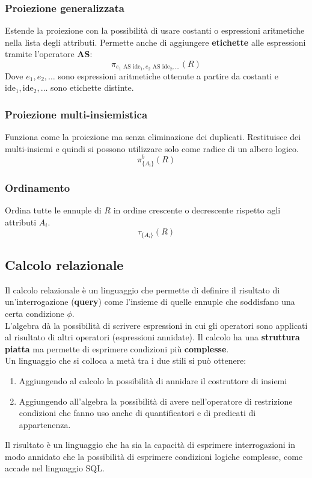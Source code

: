 \subsubsection{Proiezione generalizzata}
Estende la proiezione con la possibilità di usare costanti o espressioni aritmetiche nella lista degli attributi. Permette anche di aggiungere \textbf{etichette} alle espressioni tramite l'operatore \textbf{AS}:
\begin{equation}
	\pi_{e_1\text{ AS } \text{ide}_1, e_2\text{ AS } \text{ide}_2, \ldots}(R)
\end{equation}
Dove $e_1, e_2, \ldots$ sono espressioni aritmetiche ottenute a partire da costanti e $\text{ide}_1, \text{ide}_2, \ldots$ sono etichette distinte.
\subsubsection{Proiezione multi-insiemistica}
Funziona come la proiezione ma senza eliminazione dei duplicati. Restituisce dei multi-insiemi e quindi si possono utilizzare solo come radice di un albero logico.
\begin{equation}
	\pi^b_{\{A_i\}}(R)
\end{equation}
\subsubsection{Ordinamento}
Ordina tutte le ennuple di $R$ in ordine crescente o decrescente rispetto agli attributi $A_i$.
\begin{equation}
	\tau_{\{A_i\}}(R)
\end{equation}

\subsection{Calcolo relazionale}
Il calcolo relazionale è un linguaggio che permette di definire il risultato di un’interrogazione (\textbf{query}) come l’insieme di quelle ennuple che soddisfano una certa condizione $\phi$.\\

L’algebra dà la possibilità di scrivere espressioni in cui gli operatori sono applicati al risultato di altri operatori (espressioni annidate). Il calcolo ha una \textbf{struttura piatta} ma permette di esprimere condizioni più \textbf{complesse}.\\
Un linguaggio che si colloca a metà tra i due stili si può ottenere:
\begin{enumerate}
	\item Aggiungendo al calcolo la possibilità di annidare il costruttore di insiemi
	\item Aggiungendo all’algebra la possibilità di avere nell’operatore di restrizione	condizioni che fanno uso anche di quantificatori e di predicati di appartenenza.
\end{enumerate}
Il risultato è un linguaggio che ha sia la capacità di esprimere interrogazioni in modo annidato che la possibilità di esprimere condizioni logiche complesse, come accade nel linguaggio SQL.

